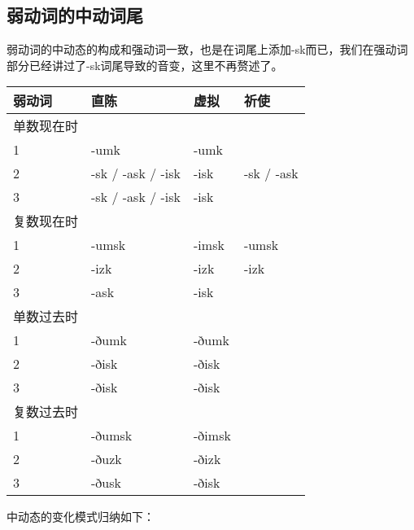 \subsection{弱动词的中动词尾}\label{弱动词的中动词尾}

弱动词的中动态的构成和强动词一致，也是在词尾上添加-sk而已，我们在强动词部分已经讲过了-sk词尾导致的音变，这里不再赘述了。

\begin{longtable}{llll}
  \toprule
  弱动词     & 直陈              & 虚拟   & 祈使       \\
  \midrule
  \endhead
  \bottomrule
  \endfoot
  单数现在时 &                   &        &            \\
  1          & -umk              & -umk   &            \\
  2          & -sk / -ask / -isk & -isk   & -sk / -ask \\
  3          & -sk / -ask / -isk & -isk   &            \\
  复数现在时 &                   &        &            \\
  1          & -umsk             & -imsk  & -umsk      \\
  2          & -izk              & -izk   & -izk       \\
  3          & -ask              & -isk   &            \\
  单数过去时 &                   &        &            \\
  1          & -ðumk             & -ðumk  &            \\
  2          & -ðisk             & -ðisk  &            \\
  3          & -ðisk             & -ðisk  &            \\
  复数过去时 &                   &        &            \\
  1          & -ðumsk            & -ðimsk &            \\
  2          & -ðuzk             & -ðizk  &            \\
  3          & -ðusk             & -ðisk  &            \\
\end{longtable}

中动态的变化模式归纳如下：

